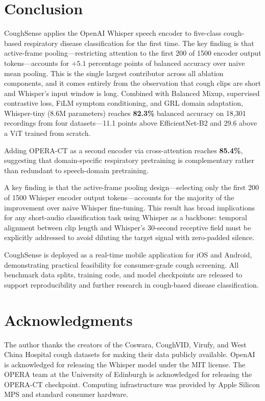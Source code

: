 \documentclass[10pt,journal,compsoc]{IEEEtran}
\begin{document}
\section{Conclusion}
\label{sec:conclusion}

CoughSense applies the OpenAI Whisper speech encoder to five-class
cough-based respiratory disease classification for the first time.
The key finding is that active-frame pooling---restricting attention to the
first 200 of 1500 encoder output tokens---accounts for $+5.1$ percentage
points of balanced accuracy over naive mean pooling. This is the single
largest contributor across all ablation components, and it comes entirely
from the observation that cough clips are short and Whisper's input window
is long. Combined with Balanced Mixup, supervised contrastive loss, FiLM
symptom conditioning, and GRL domain adaptation, Whisper-tiny (8.6M
parameters) reaches \textbf{82.3\%} balanced accuracy on 18{,}301 recordings
from four datasets---11.1 points above EfficientNet-B2 and 29.6 above a
ViT trained from scratch.

Adding OPERA-CT as a second encoder via cross-attention reaches \textbf{85.4\%},
suggesting that domain-specific respiratory pretraining is complementary
rather than redundant to speech-domain pretraining.

A key finding is that the active-frame pooling design---selecting only the
first 200 of 1500 Whisper encoder output tokens---accounts for the
majority of the improvement over naive Whisper fine-tuning.
This result has broad implications for any short-audio classification task
using Whisper as a backbone: temporal alignment between clip length and
Whisper's 30-second receptive field must be explicitly addressed to
avoid diluting the target signal with zero-padded silence.

CoughSense is deployed as a real-time mobile application for iOS and Android,
demonstrating practical feasibility for consumer-grade cough screening.
All benchmark data splits, training code, and model checkpoints are released
to support reproducibility and further research in cough-based
disease classification.

\section*{Acknowledgments}

The author thanks the creators of the Coswara, CoughVID, Virufy, and
West China Hospital cough datasets for making their data publicly available.
OpenAI is acknowledged for releasing the Whisper model under the MIT license.
The OPERA team at the University of Edinburgh is acknowledged for releasing
the OPERA-CT checkpoint. Computing infrastructure was provided by
Apple Silicon MPS and standard consumer hardware.
\end{document}
